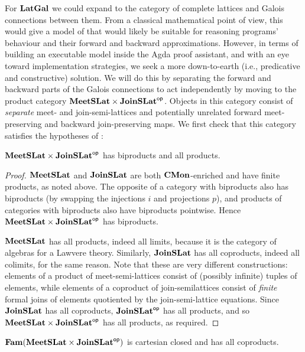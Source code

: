 For $\mathbf{LatGal}$ we could expand to the category of complete lattices and
Galois connections between them. From a classical mathematical point
of view, this would give a model of \GPS that would likely be suitable
for reasoning programs' behaviour and their forward and backward
approximations. However, in terms of building an executable model
inside the Agda proof assistant, and with an eye toward implementation
strategies, we seek a more down-to-earth (i.e., predicative and
constructive) solution. We will do this by separating the forward and
backward parts of the Galois connections to act independently by
moving to the product category $\mathbf{MeetSLat} \times
\mathbf{JoinSLat}^{\mathsf{op}}$. Objects in this category consist of \emph{separate}
meet- and join-semi-lattices and potentially unrelated forward
meet-preserving and backward join-preserving maps. We first check that
this category satisfies the hypotheses of :

\begin{proposition}
  $\mathbf{MeetSLat} \times \mathbf{JoinSLat}^{\mathsf{op}}$ has biproducts and all products.
\end{proposition}

\begin{proof}
  $\mathbf{MeetSLat}$ and $\mathbf{JoinSLat}$ are both $\mathbf{CMon}$-enriched and have
  finite products, as noted above. The opposite of a category with
  biproducts also has biproducts (by swapping the injections $i$ and
  projections $p$), and products of categories with biproducts also
  have biproducts pointwise. Hence $\mathbf{MeetSLat} \times \mathbf{JoinSLat}^{\mathsf{op}}$
  has biproducts.

  $\mathbf{MeetSLat}$ has all products, indeed all limits, because it is the
  category of algebras for a Lawvere theory. Similarly, $\mathbf{JoinSLat}$
  has all coproducts, indeed all colimits, for the same reason. Note
  that these are very different constructions: elements of a product
  of meet-semi-lattices consist of (possibly infinite) tuples of
  elements, while elements of a coproduct of join-semilattices consist
  of \emph{finite} formal joins of elements quotiented by the
  join-semi-lattice equations. Since $\mathbf{JoinSLat}$ has all coproducts,
  $\mathbf{JoinSLat}^{\mathsf{op}}$ has all products, and so
  $\mathbf{MeetSLat} \times \mathbf{JoinSLat}^{\mathsf{op}}$ has all products, as required.
\end{proof}

\begin{corollary}
  $\mathbf{Fam}(\mathbf{MeetSLat} \times \mathbf{JoinSLat}^{\mathsf{op}})$ is cartesian closed and has
  all coproducts.
\end{corollary}

